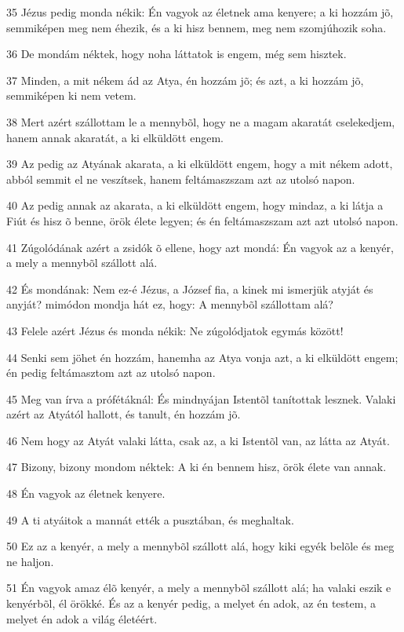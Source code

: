 \par 35 Jézus pedig monda nékik: Én vagyok az életnek ama kenyere; a ki hozzám jõ, semmiképen meg nem éhezik, és a ki hisz bennem, meg nem szomjúhozik soha.
\par 36 De mondám néktek, hogy noha láttatok is engem, még sem hisztek.
\par 37 Minden, a mit nékem ád az Atya, én hozzám jõ; és azt, a ki hozzám jõ, semmiképen ki nem vetem.
\par 38 Mert azért szállottam le a mennybõl, hogy ne a magam akaratát cselekedjem, hanem annak  akaratát, a ki elküldött engem.
\par 39 Az pedig az Atyának akarata, a ki elküldött engem, hogy a mit nékem adott, abból semmit el ne veszítsek, hanem feltámaszszam azt az utolsó napon.
\par 40 Az pedig annak az akarata, a ki elküldött engem, hogy mindaz, a ki látja a Fiút és hisz õ benne, örök élete legyen; és én feltámaszszam azt azt utolsó napon.
\par 41 Zúgolódának azért a zsidók õ ellene, hogy azt mondá: Én vagyok az a kenyér, a mely a mennybõl szállott alá.
\par 42 És mondának: Nem ez-é Jézus, a József fia, a kinek mi ismerjük atyját és anyját? mimódon mondja hát ez, hogy: A mennybõl szállottam alá?
\par 43 Felele azért Jézus és monda nékik: Ne zúgolódjatok egymás között!
\par 44 Senki sem jöhet én hozzám, hanemha az Atya vonja azt, a ki elküldött engem; én pedig feltámasztom azt az utolsó napon.
\par 45 Meg van írva a prófétáknál: És mindnyájan Istentõl tanítottak lesznek. Valaki azért az Atyától hallott, és tanult, én hozzám jõ.
\par 46 Nem hogy az Atyát valaki látta, csak az, a ki Istentõl van, az látta az Atyát.
\par 47 Bizony, bizony mondom néktek: A ki én bennem hisz, örök élete van annak.
\par 48 Én vagyok az életnek kenyere.
\par 49 A ti atyáitok a mannát ették a pusztában, és meghaltak.
\par 50 Ez az a kenyér, a mely a mennybõl szállott alá, hogy kiki egyék belõle és meg ne haljon.
\par 51 Én vagyok amaz élõ kenyér, a mely a mennybõl szállott alá; ha valaki eszik e kenyérbõl, él örökké. És az a kenyér pedig, a melyet én adok, az én testem, a melyet én adok a világ életéért.
